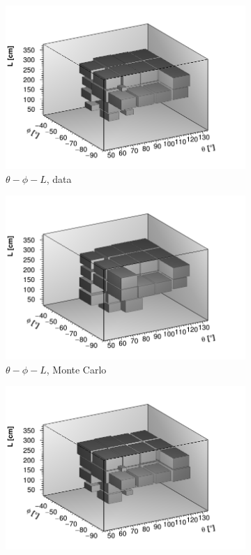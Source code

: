 \documentclass[a4paper]{scrartcl}
\begin{document}
\begin{figure}[htbp]
\begin{center}
\begin{subfigure}{0.52\textwidth}
\includegraphics[width=\linewidth]{figures/theta_phi_l_data.png}
\caption{$\theta - \phi - L$, data} \label{fig:3d_cry}
\end{subfigure}\begin{subfigure}{0.52\textwidth}
\includegraphics[width=\linewidth]{figures/theta_phi_l_mc.png}
\caption{$\theta - \phi - L$, Monte Carlo}\label{fig:3d_cry_mc}
\end{subfigure}
\begin{subfigure}{0.52\textwidth}
\includegraphics[width=\linewidth]{figures/ratio_theta_phi_l.png}

\end{subfigure}
\end{center}
\end{figure}
\end{document}
